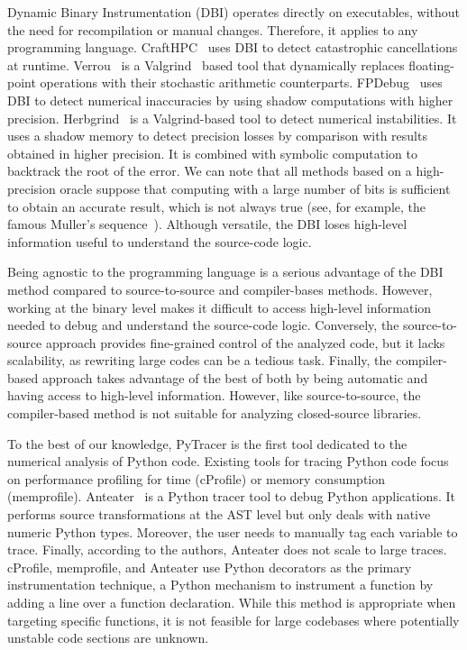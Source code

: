 \documentclass[10pt,journal,compsoc]{IEEEtran}
\newcommand{\pytracer}[0]{PyTracer\xspace}
\DeclareRobustCommand{\add}[1]{\textcolor{ao(english)}{#1}}%
\DeclareRobustCommand{\remove}[1]{}
\DeclareRobustCommand{\add}[1]{#1}
\DeclareRobustCommand{\remove}[1]{}
\begin{document}
Dynamic Binary Instrumentation (DBI) operates directly on executables, without
the need for recompilation or manual changes. Therefore, it applies to any
programming language. CraftHPC~\cite{lam2013dynamic} uses DBI to detect
catastrophic cancellations at runtime. Verrou~\cite{fevotte2016verrou} is a
Valgrind~\cite{nethercote2007valgrind} based tool that dynamically replaces
floating-point operations with their stochastic arithmetic counterparts.
FPDebug~\cite{benz2012dynamic} uses DBI to detect numerical inaccuracies by
using shadow computations with higher precision.
Herbgrin\remove{g}\add{d}~\cite{sanchez2017finding} is a Valgrind-based tool to
detect numerical instabilities. It uses a shadow memory to detect  precision
losses by comparison with results obtained \remove{at} \add{in} higher
precision. It is combined with symbolic computation to backtrack the root of the
error. We can note that all methods based on a high-precision oracle suppose
that computing with a large number of bits is sufficient to obtain an accurate
result, which is not always true (see, for example, the famous Muller's
sequence~\cite{bajard1996introduction}). Although versatile, the DBI loses
high-level information useful to understand the source-code logic.

Being agnostic to the programming language is a serious advantage of the DBI
method compared to source-to-source and compiler-bases methods. However, working
at the binary level makes it difficult to access high-level information needed
to debug and understand the source-code logic. Conversely, the source-to-source
approach provides fine-grained control of the analyzed code, but it lacks
scalability, as rewriting large codes can be a tedious task. Finally, the
compiler-based approach takes advantage of the best of both by being automatic
and having access to high-level information. However, like source-to-source, the
compiler-based method is not suitable for analyzing closed-source libraries.

To the best of our knowledge, \pytracer is the first tool dedicated to the
numerical analysis of Python code. Existing tools for tracing Python code focus
on performance profiling for time (cProfile) or memory consumption (memprofile).
Anteater~\cite{faust2019anteater} is a Python tracer tool to debug Python
applications. It performs source transformations at the AST level but only deals
with native numeric Python types. Moreover, the user needs to manually tag each
variable to trace. Finally, according to the authors, Anteater does not scale to
large traces. cProfile, memprofile, and Anteater use Python decorators as the
primary instrumentation technique, a Python mechanism to instrument a function
by adding a line over a function declaration. While this method is appropriate
when targeting specific functions, it is not feasible for large codebases where
potentially unstable code sections are unknown.
\end{document}
